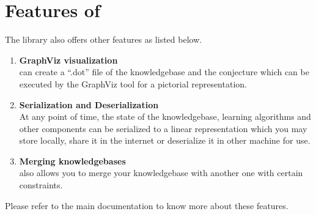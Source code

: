 \section{Features of \libalf}
The library also offers other features as listed below.
\begin{enumerate}
 \item \textbf{GraphViz visualization} \\
       \libalf can create a ``.dot'' file of the knowledgebase and the conjecture which can be executed by the GraphViz tool for a pictorial representation.
 \item \textbf{Serialization and Deserialization} \\
	At any point of time, the state of the knowledgebase, learning algorithms and other components can be serialized to a linear representation which you may store locally, share it in the internet or deserialize it in other machine for use.
 \item \textbf{Merging knowledgebases} \\
	\libalf also allows you to merge your knowledgebase with another one with certain constraints.
\end{enumerate}
Please refer to the main documentation to know more about these features.

